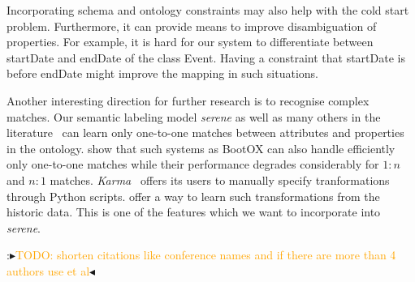 \documentclass[letterpaper]{article} %
\newcommand{\authornote}[3]{
  {\fbox{\sc 
  #1}:$\blacktriangleright$\textcolor{#2}{\small{#3}}$\blacktriangleleft$}%
}
\newcommand{\npr}[1]{\authornote{NPR}{orange}{#1}}
\begin{document}
Incorporating schema and ontology constraints may also help with the cold start problem.
Furthermore, it can provide means to improve disambiguation of properties.
For example, it is hard for our system to differentiate between startDate and endDate of the class Event.
Having a constraint that startDate is before endDate might improve the mapping in such situations.

Another interesting direction for further research is to recognise complex matches.
Our semantic labeling model \emph{serene} as well as many others in the literature~\cite{Pham:semantic}\cite{Ritze:matching} can learn only one-to-one matches between attributes and properties in the ontology.
\cite{Pinkel:rodi} show that such systems as BootOX can also handle efficiently only one-to-one matches while their performance degrades considerably for $1:n$ and $n:1$ matches.
\emph{Karma}~\cite{taheriyan2016learning} offers its users to manually specify tranformations through Python scripts.
\cite{Dhamankar:imap} offer a way to learn such transformations from the historic data.
This is one of the features which we want to incorporate into \emph{serene}.


\npr{TODO: shorten citations like conference names and if there are more than 4 authors use et al}

\end{document}
